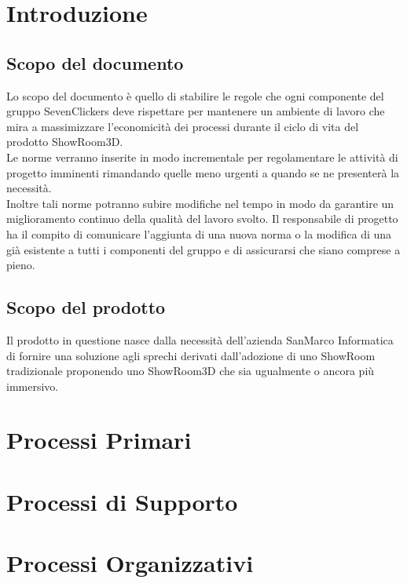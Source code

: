 \documentclass[a4paper]{article}
\begin{document}




\pagebreak

{
    \hypersetup{linkcolor=black}
    \tableofcontents
}
\pagebreak

\section{Introduzione}
\subsection{Scopo del documento}
Lo scopo del documento è quello di stabilire le regole che ogni componente del gruppo SevenClickers
deve rispettare per mantenere un ambiente di lavoro che mira a massimizzare
l'economicità dei processi durante il ciclo di vita del prodotto ShowRoom3D.\\
Le norme verranno inserite in modo incrementale per regolamentare le attività di progetto imminenti rimandando quelle meno urgenti a quando 
se ne presenterà la necessità.\\
Inoltre tali norme potranno subire modifiche nel tempo in modo da garantire un miglioramento continuo della qualità del lavoro svolto.
Il responsabile di progetto ha il compito di comunicare l'aggiunta di una nuova norma o la modifica di una già esistente a tutti i componenti
del gruppo e di assicurarsi che siano comprese a pieno.
\subsection{Scopo del prodotto}
Il prodotto in questione nasce dalla necessità dell'azienda SanMarco Informatica di fornire una soluzione agli sprechi
derivati dall'adozione di uno ShowRoom tradizionale proponendo uno ShowRoom3D che sia 
ugualmente o ancora più immersivo.
\pagebreak
\section{Processi Primari}
\pagebreak
\section{Processi di Supporto}

\pagebreak

\pagebreak
\section{Processi Organizzativi}

\pagebreak

\pagebreak

\pagebreak

\pagebreak
\end{document}
